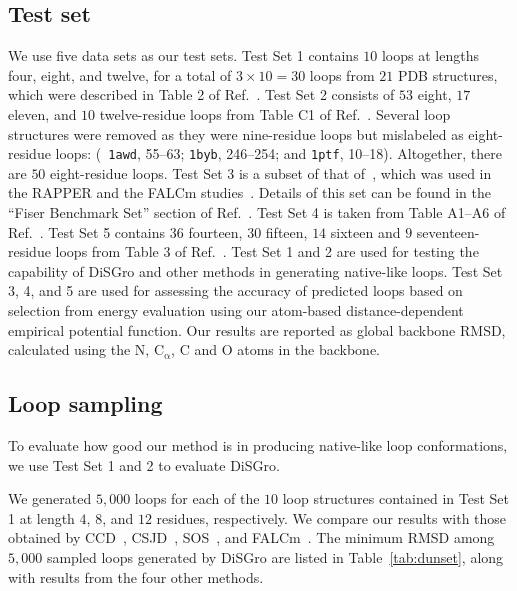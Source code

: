 \subsection*{Test set}
We use five data sets as our test sets. Test Set 1 contains $10$
loops at lengths four, eight, and twelve, for a total of
$3\times10=30$ loops from $21$ PDB structures, which were described
in Table 2 of Ref.~\cite{canutescu2003}. Test Set 2 consists of $53$
eight, $17$ eleven, and $10$ twelve-residue loops from Table C1 of
Ref.~\cite{soto2008}. Several loop structures were removed as they
were nine-residue loops but mislabeled as eight-residue loops: ({\tt
1awd}, 55--63; {\tt 1byb}, 246--254; and {\tt 1ptf}, 10--18).
Altogether, there are $50$ eight-residue loops. Test Set 3 is a
subset of that of~\cite{fiser2000}, which was used in the RAPPER and
the FALCm studies~\cite{depristo2003,lee2010}. Details of this set
can be found in the ``Fiser Benchmark Set'' section of
Ref.~\cite{depristo2003}. Test Set 4 is taken from Table A1--A6 of
Ref.~\cite{soto2008}. Test Set 5 contains $36$ fourteen, $30$
fifteen, $14$ sixteen and $9$ seventeen-residue loops from Table 3
of Ref.~\cite{zhao2011}. Test Set 1 and 2 are used for testing the
capability of {\sc DiSGro} and other methods in generating
native-like loops. Test Set 3, 4, and 5 are used for assessing the
accuracy of predicted loops based on selection from energy
evaluation using our atom-based distance-dependent empirical
potential function. Our results are reported as global backbone
RMSD, calculated using the N, $\mathrm{C_{\alpha}}$, C and O atoms
in the backbone.

\subsection*{Loop sampling}
To evaluate how good our method is in producing native-like loop
conformations, we use Test Set 1 and 2 to evaluate {\sc DiSGro}.

We generated $5,000$ loops for each of the $10$ loop structures
contained in Test Set 1 at length $4$, $8$, and $12$ residues,
respectively. We compare our results with those obtained by
CCD~\cite{canutescu2003}, CSJD~\cite{coutsias2004},
SOS~\cite{liu2009}, and FALCm~\cite{lee2010}. The minimum RMSD among
$5,000$ sampled loops generated by {\sc DiSGro} are listed in
Table~\ref{tab:dunset}, along with results from the four other
methods.

